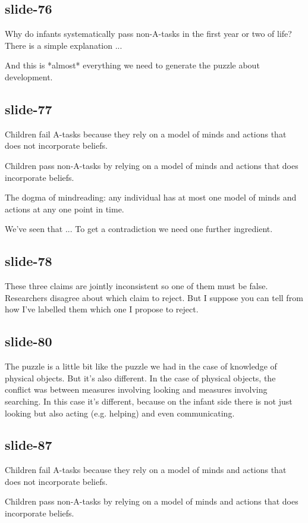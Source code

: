 \documentclass[12pt,\papersize]{extarticle}
\begin{document}
\subsection{slide-76}
Why do infants systematically pass non-A-tasks in the first year
or two of life? There is a simple explanation ...

And this is *almost* everything we need to generate the puzzle about development.

\subsection{slide-77}
Children fail A-tasks
because they rely on a model of minds and actions that does not incorporate beliefs.

Children pass non-A-tasks
by relying on a model of minds and actions that does incorporate beliefs.

The dogma of mindreading: any individual has at most one model of minds and actions
at any one point in time.

We’ve seen that ...
To get a contradiction we need one further ingredient.

\subsection{slide-78}
These three claims are jointly inconsistent so one of them must be false.
Researchers disagree about which claim to reject.
But I suppose you can tell from how I’ve labelled them which one I
propose to reject.

\subsection{slide-80}
The puzzle is a little bit like the puzzle we had in the case of knowledge
of physical objects.
But it's also different.
In the case of physical objects, the conflict was between measures
involving looking and measures involving searching.
In this case it's different, because on the infant side there is not just
looking but also acting (e.g. helping) and even communicating.

\subsection{slide-87}
Children fail A-tasks
because they rely on a model of minds and actions that does not incorporate beliefs.

Children pass non-A-tasks
by relying on a model of minds and actions that does incorporate beliefs.
\end{document}

